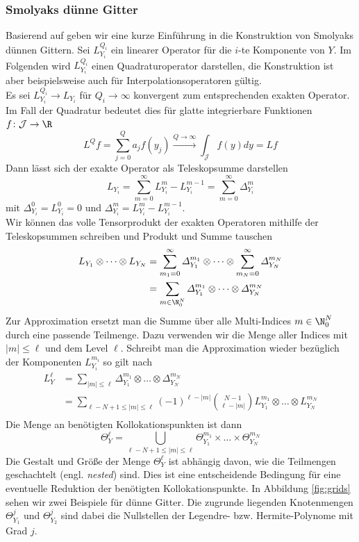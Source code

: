 \subsubsection*{Smolyaks dünne Gitter}
Basierend auf \autocite{ConradMarzouk} geben wir eine kurze Einführung in die Konstruktion von Smolyaks dünnen Gittern. Sei $L_{Y_i}^{Q_i}$ ein linearer Operator für die $i$-te Komponente von $Y$. Im Folgenden wird $L_{Y_i}^{Q_i}$ einen Quadraturoperator darstellen, die Konstruktion ist aber beispielsweise auch für Interpolationsoperatoren gültig.\\
Es sei $L_{Y_i}^{Q_i}\to L_{Y_i}$ für $Q_i\to\infty$ konvergent zum entsprechenden exakten Operator. Im Fall der Quadratur bedeutet dies für glatte integrierbare Funktionen $f\colon \mathcal{J}\to\R$
\[L^Qf=\sum_{j=0}^Q a_jf(y_j)\xrightarrow[]{Q\to\infty}\int_\mathcal{J}f(y)dy=Lf\]
Dann lässt sich der exakte Operator als Teleskopsumme darstellen
\[L_{Y_i}=\sum_{m=0}^\infty L_{Y_i}^m - L_{Y_i}^{m-1}=\sum_{m=0}^\infty \varDelta_{Y_i}^m\]
mit $\varDelta_{Y_i}^0=L_{Y_i}^0=0$ und $\varDelta_{Y_i}^m=L_{Y_i}^m-L_{Y_i}^{m-1}$.\\
Wir können das volle Tensorprodukt der exakten Operatoren mithilfe der Teleskopsummen schreiben und Produkt und Summe tauschen
\begin{align*}
L_{Y_1}\otimes\dots\otimes L_{Y_N}&=\sum_{m_1=0}^\infty \varDelta_{Y_1}^{m_1}\otimes\dots\otimes \sum_{m_N=0}^\infty\varDelta_{Y_N}^{m_N}\\
&=\sum_{m\in\N_0^N} \varDelta_{Y_1}^{m_1}\otimes\dots\otimes \varDelta_{Y_N}^{m_N}\\
\end{align*}
Zur Approximation ersetzt man die Summe über alle Multi-Indices $m\in\N_0^N$ durch eine passende Teilmenge. Dazu verwenden wir die Menge aller Indices mit $|m|\le \ell$ und dem Level $\ell$. Schreibt man die Approximation wieder bezüglich der Komponenten $L_{Y_i}^{m_i}$ so gilt nach \autocite{NoTeWe07}
\begin{align*}
L_Y^\ell &= \sum_{|m|\le \ell} \varDelta_{Y_1}^{m_1}\otimes\dots\otimes \varDelta_{Y_N}^{m_N}\\
&= \sum_{\ell - N+1\le |m|\le \ell} (-1)^{\ell - |m|}\binom{N-1}{\ell - |m|}L_{Y_1}^{m_1}\otimes\dots\otimes L_{Y_N}^{m_N}\\
\end{align*}
Die Menge an benötigten Kollokationspunkten ist dann 
\[\Theta_Y^\ell=\bigcup_{\ell - N+1\le |m|\le \ell} \Theta_{Y_1}^{m_1}\times\dots\times \Theta_{Y_N}^{m_N}\]
Die Gestalt und Größe der Menge $\Theta_Y^\ell$ ist abhängig davon, wie die Teilmengen geschachtelt (engl. \emph{nested}) sind. Dies ist eine entscheidende Bedingung für eine eventuelle Reduktion der benötigten Kollokationspunkte. In Abbildung \ref{fig:grids} sehen wir zwei Beispiele für dünne Gitter. Die zugrunde liegenden Knotenmengen $\Theta_{Y_1}^j$ und $\Theta_{Y_2}^j$ sind dabei die Nullstellen der Legendre- bzw. Hermite-Polynome mit Grad $j$.
